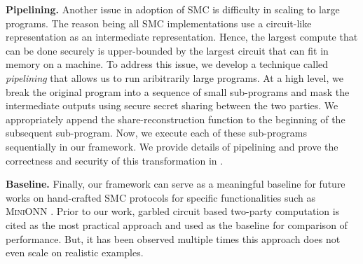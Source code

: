 \textbf{Pipelining.} Another issue in adoption of SMC is difficulty in scaling to large programs. 
The reason being all SMC implementations use a circuit-like representation as an intermediate representation. Hence, the largest compute that can be done securely is upper-bounded by the largest circuit that can fit in memory on a machine. 
To address this issue, we develop a technique called \emph{pipelining} that allows us to run aribitrarily large programs. At a high level, we break the original program into a sequence of small sub-programs and mask the intermediate outputs using secure secret sharing between the two parties. We appropriately append the share-reconstruction function to the beginning of the subsequent sub-program. Now, we execute each of these sub-programs sequentially in our framework. We provide details of pipelining and prove the correctness and security of this transformation in .

\textbf{Baseline.} Finally, our framework \tool can serve as a meaningful baseline for future works on hand-crafted SMC protocols for specific functionalities such as \textsc{MiniONN} \cite{minionn}. 
Prior to our work, garbled circuit based two-party computation is cited as the most practical approach and used as the baseline for comparison of performance. But, it has been observed multiple times this approach does not even scale on realistic examples.



